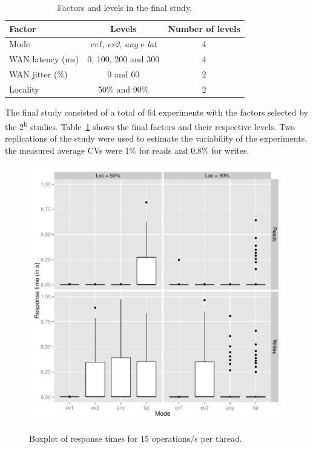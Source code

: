 \documentclass[man,floatsintext,12pt]{apa6}
\begin{document}
\begin{table}[h!]
\caption{Factors and levels in the final study.}
\begin{tabular}{lcc} \toprule

Factor & Levels & Number of levels\\ \midrule

Mode & \textit{ev1}, \textit{ev2}, \textit{any} e \textit{lat} & 4\\

WAN latency (ms) & 0, 100, 200 and 300 & 4\\

WAN jitter (\%) & 0 and 60 & 2\\

Locality & 50\% and 90\% & 2\\ \bottomrule

\end{tabular}

\label{tab:fatores_e_niveis_do_estudo_final}

\end{table}

The final study consisted of a total of 64 experiments with the factors
selected by the 2\textsuperscript{k} studies.
Table~\ref{tab:fatores_e_niveis_do_estudo_final} shows the final factors and
their respective levels. Two replications of the study were used to estimate
the variability of the experiments, the measured average CVs were 1\% for reads
and 0.8\% for writes.

\begin{figure}[h!]
\caption{Boxplot of response times for 15 operations/s per thread.}
\includegraphics[width=1.0\textwidth]{boxplot200.png}
\label{fig:boxplot_dos_tempos_de_resposta}
\end{figure}
\end{document}
